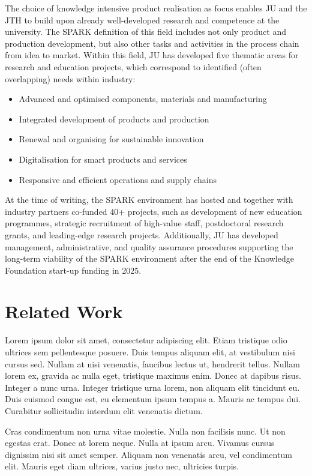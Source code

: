 \documentclass[11pt, a4paper]{resources/JTH}
\begin{document}
The choice of knowledge intensive product realisation as focus enables JU and the JTH to build upon already well-developed research and competence at the university. The SPARK definition of this field includes not only product and production development, but also other tasks and activities in the process chain from idea to market. Within this field, JU has developed five thematic areas for research and education projects, which correspond to identified (often overlapping) needs within industry:

\begin{itemize}
    \item Advanced and optimised components, materials and manufacturing
    \item Integrated development of products and production
    \item Renewal and organising for sustainable innovation
    \item Digitalisation for smart products and services
    \item Responsive and efficient operations and supply chains
\end{itemize}

At the time of writing, the SPARK environment has hosted and together with industry partners co-funded 40+ projects, such as development of new education programmes, strategic recruitment of high-value staff, postdoctoral research grants, and leading-edge research projects. Additionally, JU has developed management, administrative, and quality assurance procedures supporting the long-term viability of the SPARK environment after the end of the Knowledge Foundation start-up funding in 2025.

\chapter{Related Work}
\label{chap:RelatedWork}

Lorem ipsum dolor sit amet, consectetur adipiscing elit. Etiam tristique odio ultrices sem pellentesque posuere. Duis tempus aliquam elit, at vestibulum nisi cursus sed. Nullam at nisi venenatis, faucibus lectus ut, hendrerit tellus. Nullam lorem ex, gravida ac nulla eget, tristique maximus enim. Donec at dapibus risus. Integer a nunc urna. Integer tristique urna lorem, non aliquam elit tincidunt eu. Duis euismod congue est, eu elementum ipsum tempus a. Mauris ac tempus dui. Curabitur sollicitudin interdum elit venenatis dictum.

Cras condimentum non urna vitae molestie. Nulla non facilisis nunc. Ut non egestas erat. Donec at lorem neque. Nulla at ipsum arcu. Vivamus cursus dignissim nisi sit amet semper. Aliquam non venenatis arcu, vel condimentum elit. Mauris eget diam ultrices, varius justo nec, ultricies turpis.
\end{document}
